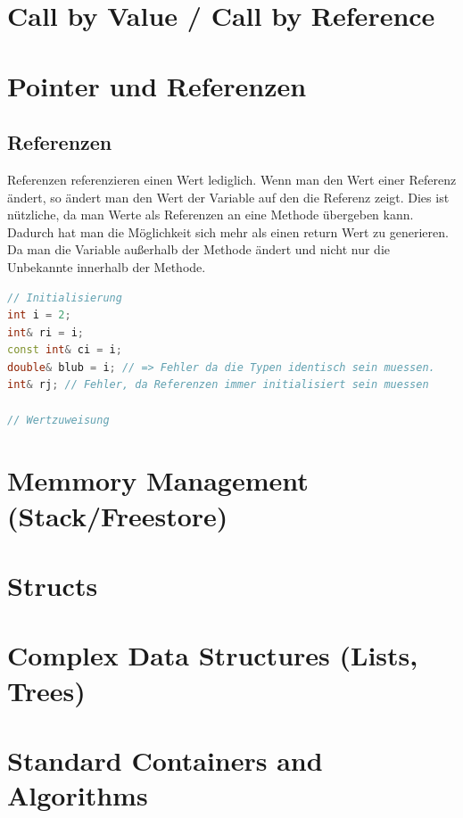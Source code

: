 \section{Call by Value / Call by Reference}
\section{Pointer und Referenzen}
\subsection{Referenzen}
Referenzen referenzieren einen Wert lediglich. Wenn man den Wert einer Referenz ändert, so ändert man den Wert der Variable auf den die Referenz zeigt. Dies ist nützliche, da man Werte als Referenzen an eine Methode übergeben kann. Dadurch hat man die Möglichkeit sich mehr als einen return Wert zu generieren. Da man die Variable außerhalb der Methode ändert und nicht nur die Unbekannte innerhalb der Methode. \\
\begin{lstlisting}[language=C++]
// Initialisierung
int i = 2;
int& ri = i; 
const int& ci = i;
double& blub = i; // => Fehler da die Typen identisch sein muessen.
int& rj; // Fehler, da Referenzen immer initialisiert sein muessen

// Wertzuweisung

\end{lstlisting}
\section{Memmory Management (Stack/Freestore)}
\section{Structs}
\section{Complex Data Structures (Lists, Trees)}
\section{Standard Containers and Algorithms}	

